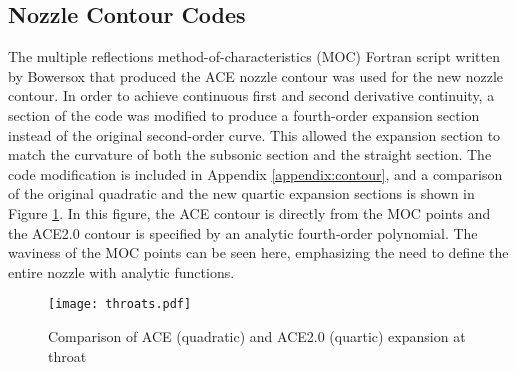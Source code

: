     
\subsection{Nozzle Contour Codes}

The multiple reflections method-of-characteristics (MOC) Fortran script written by Bowersox that produced the ACE nozzle contour was used for the new nozzle contour. In order to achieve continuous first and second derivative continuity, a section of the code was modified to produce a fourth-order expansion section instead of the original second-order curve. This allowed the expansion section to match the curvature of both the subsonic section and the straight section. The code modification is included in Appendix \ref{appendix:contour}, and a comparison of the original quadratic and the new quartic expansion sections is shown in Figure \ref{fig:throats}. In this figure, the ACE contour is directly from the MOC points and the ACE2.0 contour is specified by an analytic fourth-order polynomial. The waviness of the MOC points can be seen here, emphasizing the need to define the entire nozzle with analytic functions.

\begin{figure}[ht!]
    \centering
    \texttt{[image: throats.pdf]}
    \caption{Comparison of ACE (quadratic) and ACE2.0 (quartic) expansion at throat}
    \label{fig:throats}
\end{figure}

